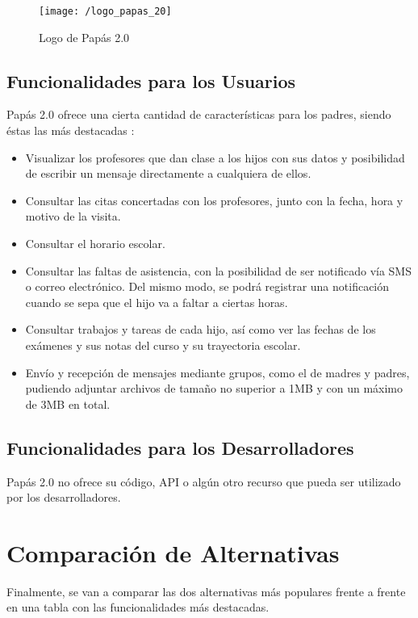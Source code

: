 \begin{figure}[!h]
	\begin{center}
		\texttt{[image: /logo\_papas\_20]}
		\caption{Logo de Papás 2.0}
		\label{fig:papas20}
	\end{center}
\end{figure}

\subsection{Funcionalidades para los Usuarios}
Papás 2.0 ofrece una cierta cantidad de características para los padres, siendo éstas las más destacadas \cite{JCCM2010}:

\begin{itemize}
	\item Visualizar los profesores que dan clase a los hijos con sus datos y posibilidad de escribir un mensaje directamente a cualquiera de ellos.
	\item Consultar las citas concertadas con los profesores, junto con la fecha, hora y motivo de la visita.
	\item Consultar el horario escolar.
	\item Consultar las faltas de asistencia, con la posibilidad de ser notificado vía SMS o correo electrónico. Del mismo modo, se podrá registrar una notificación cuando se sepa que el hijo va a faltar a ciertas horas.
	\item Consultar trabajos y tareas de cada hijo, así como ver las fechas de los exámenes y sus notas del curso y su trayectoria escolar.
	\item Envío y recepción de mensajes mediante grupos, como el de madres y padres, pudiendo adjuntar archivos de tamaño no superior a 1\acs{MB} y con un máximo de 3\acs{MB} en total.
\end{itemize}

\newpage

\subsection{Funcionalidades para los Desarrolladores}
Papás 2.0 no ofrece su código, \acs{API} o algún otro recurso que pueda ser utilizado por los desarrolladores.

\section{Comparación de Alternativas}
Finalmente, se van a comparar las dos alternativas más populares frente a frente en una tabla con las funcionalidades más destacadas.

